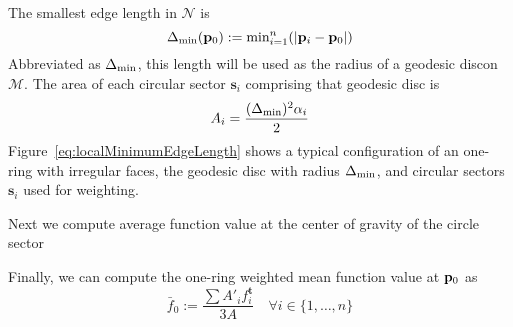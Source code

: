 The smallest edge length in $\mathcal{N}$ is 
\begin{equation}
	\Delta_\text{min}(\mathbf{p}_0) := \text{min}^n_{i=1} (|\mathbf{p}_i - \mathbf{p}_0|)
	\label{eq:localMinimumEdgeLength}
\end{equation}
%
Abbreviated as $\Delta_\text{min}$, this length will be used as the radius of a geodesic disc\todoCitation on $\mathcal{M}$. The area of each circular sector $\mathbf{s}_i$ comprising that geodesic disc is
\begin{equation}
	A_i = \frac{(\Delta_\text{min})^2\alpha_i}{2}
	\label{eq:circularSectorArea}
\end{equation}%
%
%
Figure~\ref{eq:localMinimumEdgeLength} shows a typical configuration of an one-ring with irregular faces, the geodesic disc with radius 
$\Delta_\text{min}$, and circular sectors $\mathbf{s}_i$ used for weighting.
%
\begin{figure}[ht]
\end{figure}%
%


Next we compute average function value at the center of gravity of the circle sector
\begin{equation}
	\label{eq:avFuncValAtCoG}
\end{equation}

Finally, we can compute the one-ring weighted mean function value at $\mathbf{p}_0$ as
\begin{equation}
	\bar{f}_0 := \frac{\sum A'_if^{\mathbf{t}}_i}{3A} \quad \forall i \in \{1,\ldots,n\}
	\label{eq:meanFuncValAtP0}
\end{equation}%
%






